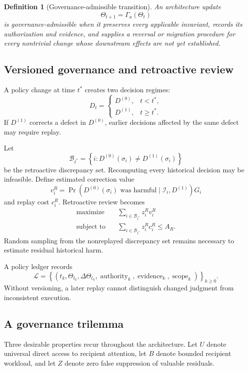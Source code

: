 \documentclass[11pt]{article}
\newtheorem{definition}{Definition}[section]
\theoremstyle{definition}
\DeclareMathOperator{\Prob}{Pr}
\begin{document}
\begin{definition}[Governance-admissible transition]
An architecture update
\[
\Theta_{t+1}=\Gamma_a(\Theta_t)
\]
is governance-admissible when it preserves every applicable invariant, records its authorization and evidence, and supplies a reversal or migration procedure for every nontrivial change whose downstream effects are not yet established.
\end{definition}

\subsection{Versioned governance and retroactive review}

A policy change at time \(t^{*}\) creates two decision regimes:
\[
D_t
=
\begin{cases}
D^{(0)},&t<t^{*},\\
D^{(1)},&t\geq t^{*}.
\end{cases}
\]
If \(D^{(1)}\) corrects a defect in \(D^{(0)}\), earlier decisions affected by the same defect may require replay.

Let
\[
\mathcal{B}_{t^{*}}
=
\left\{
i:
D^{(0)}(\sigma_i)\neq D^{(1)}(\sigma_i)
\right\}
\]
be the retroactive discrepancy set. Recomputing every historical decision may be infeasible. Define estimated correction value
\[
v_i^{R}
=
\Prob(
D^{(0)}(\sigma_i)\text{ was harmful}
\mid
\mathscr{I}_i,D^{(1)}
)
G_i
\]
and replay cost \(c_i^{R}\). Retroactive review becomes
\[
\begin{aligned}
\text{maximize}\quad&
\sum_{i\in\mathcal{B}_{t^{*}}}
z_i^{R}v_i^{R}
\\
\text{subject to}\quad&
\sum_{i\in\mathcal{B}_{t^{*}}}
z_i^{R}c_i^{R}
\leq
A_R.
\end{aligned}
\]
Random sampling from the nonreplayed discrepancy set remains necessary to estimate residual historical harm.

A policy ledger records
\[
\mathcal{L}
=
\left\{
(t_k,\Theta_{t_k},\Delta\Theta_{t_k},
\operatorname{authority}_k,
\operatorname{evidence}_k,
\operatorname{scope}_k)
\right\}_{k\geq0}.
\]
Without versioning, a later replay cannot distinguish changed judgment from inconsistent execution.

\subsection{A governance trilemma}

Three desirable properties recur throughout the architecture. Let \(U\) denote universal direct access to recipient attention, let \(B\) denote bounded recipient workload, and let \(Z\) denote zero false suppression of valuable residuals.
\end{document}
